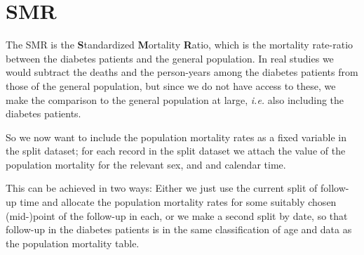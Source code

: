 \documentclass[
]{book}
\begin{document}
\section{SMR}\label{smr}

The SMR is the \textbf{S}tandardized \textbf{M}ortality
\textbf{R}atio, which is the mortality rate-ratio between the diabetes
patients and the general population. In real studies we would
subtract the deaths and the person-years among the diabetes patients
from those of the general population, but since we do not have access
to these, we make the comparison to the general population at large,
\emph{i.e.} also including the diabetes patients.

So we now want to include the population mortality rates as a fixed
variable in the split dataset; for each record in the split dataset we
attach the value of the population mortality for the relevant sex, and
and calendar time.

This can be achieved in two ways: Either we just use the current split
of follow-up time and allocate the population mortality rates for some
suitably chosen (mid-)point of the follow-up in each, or we make a
second split by date, so that follow-up in the diabetes patients is in
the same classification of age and data as the population mortality
table.
\end{document}
